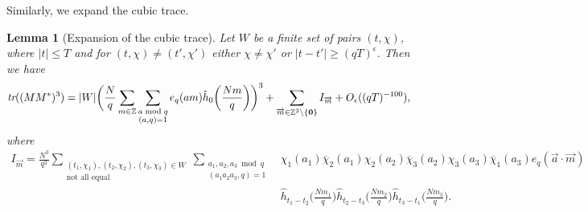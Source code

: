 \documentclass[12pt]{amsart}
\newtheorem{lemma}[theorem]{Lemma}
\theoremstyle{definition}
\theoremstyle{plain}
\theoremstyle{remark}
\numberwithin{equation}{section}
\numberwithin{theorem}{section}
\numberwithin{equation}{section}
\begin{document}
	Similarly, we expand the cubic trace. 
	\begin{lemma}[Expansion of the cubic trace]\label{cubictrace} Let $W$ be a finite set of pairs $(t, \chi)$,  where $|t| \leq T$ and for $(t, \chi)\neq (t', \chi')$ either $\chi \neq \chi'$ or $|t-t'|\geq (qT)^{\epsilon}$. Then we have
		\begin{align*}
			\emph{tr}((MM^{*})^{3}) = |W|\bigg(\frac{N}{q}\sum_{m \in \mathbb {Z}}\sum_{\substack{a \bmod q \\ (a,q)=1}}e_q(am)\hat{h}_{0}\bigg(\frac{Nm}{q}\bigg)\bigg)^{3}+\sum_{\overrightarrow{m}\in \mathbb{Z}^{3} \backslash \{\mathbf{0}\}}I_{\overrightarrow{m}}+O_{\epsilon}((qT)^{-100}),
		\end{align*}
		where
		\begin{align*}I_{\overrightarrow{m}}=\frac{N^{3}}{q^{3}}\sum_{\substack{(t_1,\chi_1),(t_2,\chi_2),(t_3,\chi_3) \in W \\ \text{not all equal}}}\sum_{\substack{a_1,a_2,a_3 \bmod q \\ (a_1a_2a_3,q)=1 }}&\chi_{1}(a_{1})\overline{\chi}_{2}(a_{1})
			\chi_{2}(a_{2})\overline{\chi}_{3}(a_{2})
			\chi_{3}(a_{3})\overline{\chi}_{1}(a_{3}) e_q(\overrightarrow{a}\cdot\overrightarrow{m})
			\\
			&\hat{h}_{t_{1}-t_{2}}\bigg(\frac{Nm_{1}}{q}\bigg)\hat{h}_{t_{2}-t_{3}}\bigg(\frac{Nm_{2}}{q}\bigg)\hat{h}_{t_{3}-t_{1}}\bigg(\frac{Nm_{3}}{q}\bigg).
		\end{align*}
	\end{lemma}
\end{document}
